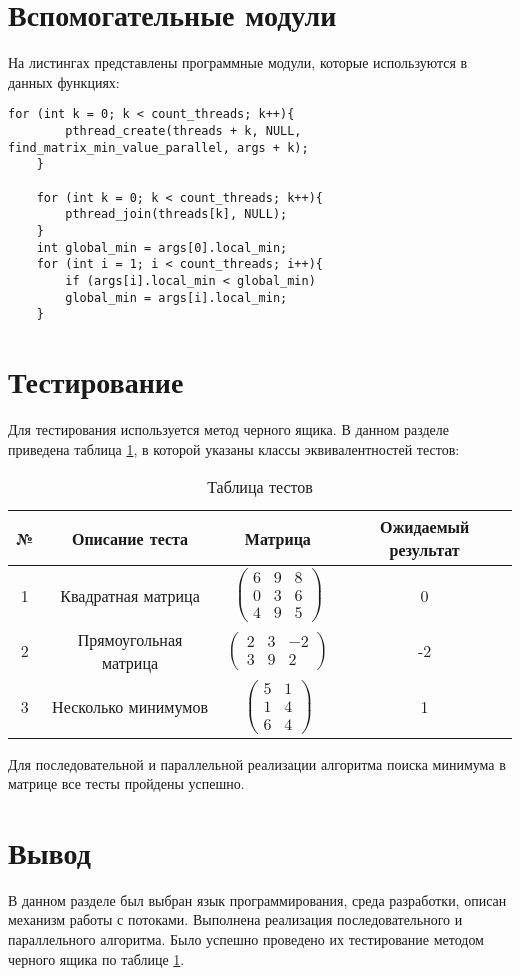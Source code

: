 \section{Вспомогательные модули}
На листингах представлены программные модули, которые используются в данных функциях:
\begin{lstlisting}[label=lst:struct_matrix,caption=Программный код класса по работе с матрицами.]	
	for (int k = 0; k < count_threads; k++){
		pthread_create(threads + k, NULL, find_matrix_min_value_parallel, args + k);
	}
	
	for (int k = 0; k < count_threads; k++){
		pthread_join(threads[k], NULL);
	}
	int global_min = args[0].local_min;
	for (int i = 1; i < count_threads; i++){
		if (args[i].local_min < global_min)
		global_min = args[i].local_min;
	}
\end{lstlisting}

\section{Тестирование}
Для тестирования используется метод черного ящика. В данном разделе приведена таблица \ref{table:ref1}, в которой указаны классы эквивалентностей тестов: \\

\begin{table}[ht!]
	\centering
	\captionsetup{singlelinecheck = false, justification=raggedright}
	\caption{Таблица тестов}
	\label{table:ref1}
	\begin{tabular}{|c|c|c|c|}
		\hline
		№ &Описание теста & Матрица  &    Ожидаемый результат\\\hline
		1& Квадратная матрица  & $\begin{pmatrix}6 & 9 & 8\\0 & 3 & 6\\4 & 9 & 5\end{pmatrix}$ & 0
		\\ \hline
		2& Прямоугольная матрица	  & $\begin{pmatrix}2 & 3 & -2\\3 & 9 & 2\end{pmatrix}$ & -2
		\\ \hline
		3& Несколько минимумов		& $\begin{pmatrix}5 & 1\\1 & 4\\6 & 4\end{pmatrix}$ & 1
		\\ \hline
	\end{tabular}
\end{table}
	Для последовательной и параллельной реализации алгоритма поиска минимума в матрице все тесты пройдены успешно.
\section{Вывод}
В данном разделе был выбран язык программирования, среда разработки, описан механизм работы с потоками. Выполнена реализация последовательного и параллельного алгоритма. Было успешно проведено их тестирование методом черного ящика по таблице \ref{table:ref1}. 

